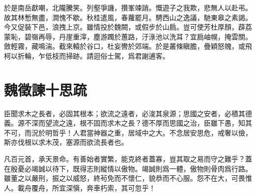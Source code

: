 於是南岳獻嘲，北隴騰笑。列壑爭譏，攢峯竦誚。慨遊子之我欺，悲無人以赴弔。故其林慙無盡，澗愧不歇。秋桂遣風，春蘿罷月。騁西山之逸議，馳東皋之素謁。今又促裝下邑，浪拽上京。雖情投於魏闕，或假步於山扃。豈可使芳杜厚顏，薜荔蒙恥，碧嶺再辱，丹崖重滓，塵游躅於蕙路，汙淥池以洗耳？宜扃岫幌，掩雲關。斂輕霧，藏鳴湍。截來轅於谷口，杜妄轡於郊端。於是叢條瞋膽，疊穎怒魄，或飛柯以折輪，乍低枝而掃跡。請迴俗士駕，爲君謝逋客。

\theendnotes

\section[諫太宗十思疏\quad{\small 魏徵}]{{\normalsize 魏徵}\quad 諫十思疏}
臣聞求木之長者，必固其根本；欲流之遠者，必浚其泉源；思國之安者，必積其德義。源不深而望流之遠，根不固而求木之長？德不厚而思國之治，臣雖下愚，知其不可，而況於明哲乎！人君當神器之重，居域中之大。不念居安思危，戒奢以儉，斯亦伐根以求木茂，塞源而欲流長者也。

凡百元首，承天景命。有善始者實繁，能克終者蓋寡，豈其取之易而守之難乎？蓋在殷憂必竭誠以待下，既得志則縱情以傲物。竭誠則爲一體，傲物則骨肉爲行路。雖董之以嚴刑，振之以威怒，終茍免而不懷仁，貌恭而不心服。怨不在大，可畏惟人。載舟覆舟，所宜深愼，奔車朽索，其可忽乎！

